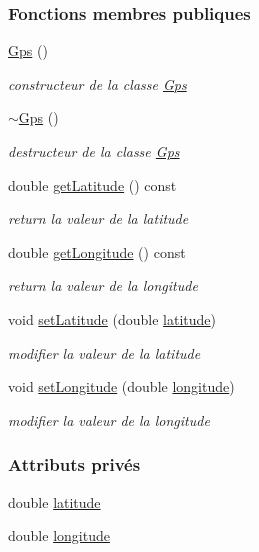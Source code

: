 \subsubsection*{Fonctions membres publiques}
\begin{DoxyCompactItemize}
\item 
\hyperlink{class_gps_a10a73359b33c1357564ebc83fc078000}{Gps} ()
\begin{DoxyCompactList}\small\item\em constructeur de la classe \hyperlink{class_gps}{Gps} \end{DoxyCompactList}\item 
\hyperlink{class_gps_a9f076d88f081ae5c010cf150cb957b66}{$\sim$\+Gps} ()
\begin{DoxyCompactList}\small\item\em destructeur de la classe \hyperlink{class_gps}{Gps} \end{DoxyCompactList}\item 
double \hyperlink{class_gps_a44c6469bf67727853c06d4be037c6b0f}{get\+Latitude} () const 
\begin{DoxyCompactList}\small\item\em return la valeur de la latitude \end{DoxyCompactList}\item 
double \hyperlink{class_gps_a6ce8da770e213bfbf7f204b107d9e3f5}{get\+Longitude} () const 
\begin{DoxyCompactList}\small\item\em return la valeur de la longitude \end{DoxyCompactList}\item 
void \hyperlink{class_gps_aaabf328f0bbcdbb9c2901e30b6edccc7}{set\+Latitude} (double \hyperlink{class_gps_a2457bce0fe69afbf68c27a4807c3f847}{latitude})
\begin{DoxyCompactList}\small\item\em modifier la valeur de la latitude \end{DoxyCompactList}\item 
void \hyperlink{class_gps_a2d9ca07c62c5bae627c2131062a1236a}{set\+Longitude} (double \hyperlink{class_gps_a6e56fa2b9f1402901a0c768b796402ce}{longitude})
\begin{DoxyCompactList}\small\item\em modifier la valeur de la longitude \end{DoxyCompactList}\end{DoxyCompactItemize}
\subsubsection*{Attributs privés}
\begin{DoxyCompactItemize}
\item 
double \hyperlink{class_gps_a2457bce0fe69afbf68c27a4807c3f847}{latitude}
\item 
double \hyperlink{class_gps_a6e56fa2b9f1402901a0c768b796402ce}{longitude}
\end{DoxyCompactItemize}


